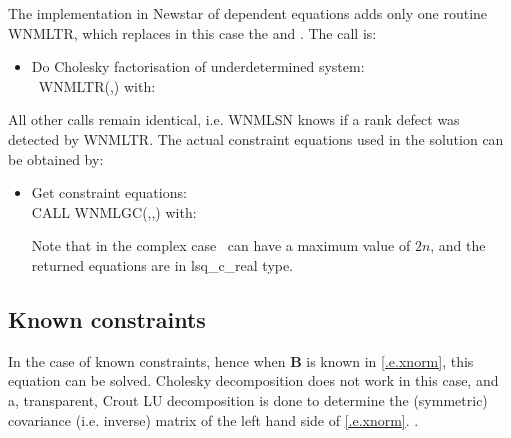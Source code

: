 The implementation in Newstar of dependent equations adds only one routine
WNMLTR, which replaces in this case the
 and . The
call is:
\begin{itemize}
\item Do Cholesky factorisation of underdetermined system:\\
	\Logic\ WNMLTR(\LSQ,\Rank) with:
\end{itemize}

All other calls remain identical, i.e. WNMLSN knows if a rank defect was
detected by WNMLTR. The actual constraint equations used in the solution can
be obtained by:
\begin{itemize}
\item Get constraint equations: \\
	CALL WNMLGC(\LSQ,\Nconst,\Constraint) with:
Note that in the complex case \Nconst\ can have a maximum value of $2n$, and
the returned equations are in {{\sc lsq}\_{\sc c}\_{\sc real}} type.
\end{itemize}

\subsection{Known constraints}

In the case of known constraints, hence when $\mathbf{B}$ is known in
\eqref{.e.xnorm}, this equation can be solved. Cholesky decomposition
does not work in this case, and a, transparent, Crout LU decomposition is
done to determine the (symmetric) covariance (i.e. inverse) matrix of the
left hand side of \eqref{.e.xnorm}.
.


